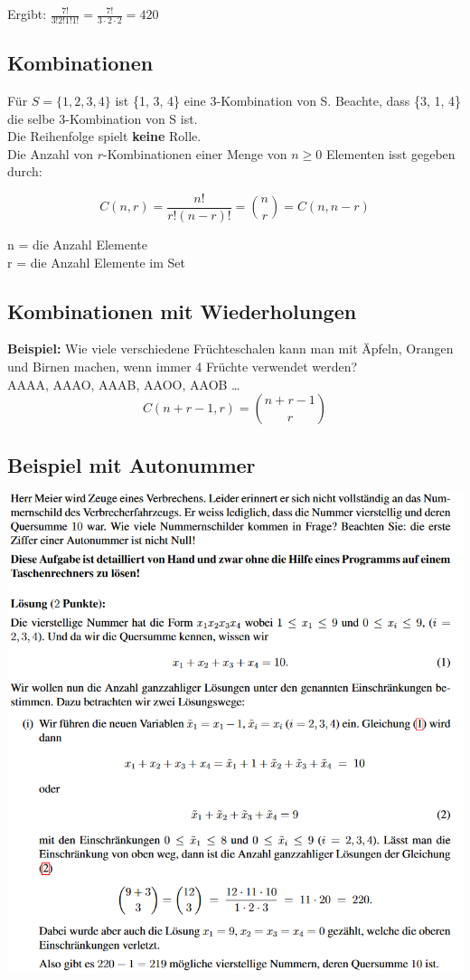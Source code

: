 \documentclass[12pt]{scrartcl}
\begin{document}
Ergibt: $\displaystyle{\frac{7!}{3!2!1!1!} = \frac{7!}{3 \cdot 2 \cdot 2} = 420}$


\newpage
\subsection{Kombinationen}
Für $S = \{1, 2, 3, 4\}$ ist \{1, 3, 4\} eine 3-Kombination von S. Beachte, dass \{3, 1, 4\} die selbe
3-Kombination von S ist.\\

Die Reihenfolge spielt \textbf{keine} Rolle.\\

Die Anzahl von $r$-Kombinationen einer Menge von $n \geq 0$ Elementen isst gegeben durch:

\[C(n, r) = \frac{n!}{r!(n-r)!} = \binom{n}{r} = C(n, n-r)\]

n = die Anzahl Elemente\\
r = die Anzahl Elemente im Set\\




\subsection{Kombinationen mit Wiederholungen}
\textbf{Beispiel:} Wie viele verschiedene Früchteschalen kann man mit Äpfeln, Orangen und Birnen
machen, wenn immer 4 Früchte verwendet werden?\\
AAAA, AAAO, AAAB, AAOO, AAOB \dots\\

\[C(n+r-1, r) = \binom{n+r-1}{r}\]


\subsection{Beispiel mit Autonummer}
\includegraphics[width=14cm]{img/autonummer beispiel.png}
\end{document}
